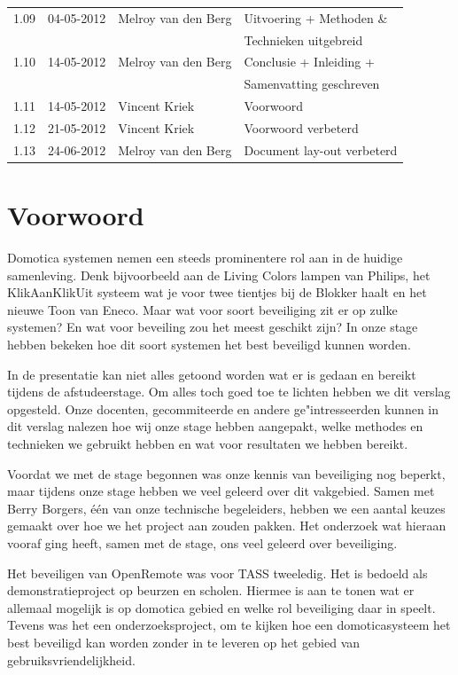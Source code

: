\documentclass[]{article}
\begin{document}
\begin{tabular}{|| l | l | l | l ||}
    1.09    &04-05-2012  &Melroy van den Berg &Uitvoering + Methoden \&        \\ 
            &            &                    &Technieken uitgebreid           \\\hline
    1.10    &14-05-2012  &Melroy van den Berg &Conclusie + Inleiding +         \\
            &            &                    &Samenvatting geschreven         \\\hline 
    1.11    &14-05-2012  &Vincent Kriek       &Voorwoord                       \\\hline
    1.12    &21-05-2012  &Vincent Kriek       &Voorwoord verbeterd             \\\hline
    1.13    &24-06-2012  &Melroy van den Berg &Document lay-out verbeterd      \\\hline
\end{tabular}

\newpage
\section*{Voorwoord}
Domotica systemen nemen een steeds prominentere rol aan in de huidige
samenleving. Denk bijvoorbeeld aan de Living Colors lampen van Philips, het
KlikAanKlikUit systeem wat je voor twee tientjes bij de Blokker haalt en het
nieuwe Toon van Eneco. Maar wat voor soort beveiliging zit er op zulke systemen?
En wat voor beveiling zou het meest geschikt zijn? In onze stage hebben bekeken
hoe dit soort systemen het best beveiligd kunnen worden.

In de presentatie kan niet alles getoond worden wat er is gedaan en bereikt
tijdens de afstudeerstage. Om alles toch goed toe te lichten hebben we dit
verslag opgesteld.  Onze docenten, gecommiteerde en andere ge"intresseerden
kunnen in dit verslag nalezen hoe wij onze stage hebben aangepakt, welke
methodes en technieken we gebruikt hebben en wat voor resultaten we hebben
bereikt.

Voordat we met de stage begonnen was onze kennis van beveiliging nog beperkt,
maar tijdens onze stage hebben we veel geleerd over dit vakgebied. Samen met
Berry Borgers, \'e\'en van onze technische begeleiders, hebben we een aantal keuzes
gemaakt over hoe we het project aan zouden pakken. Het onderzoek wat hieraan
vooraf ging heeft, samen met de stage, ons veel geleerd over beveiliging.

Het beveiligen van OpenRemote was voor TASS tweeledig. Het is bedoeld als
demonstratieproject op beurzen en scholen. Hiermee is aan te tonen wat er
allemaal mogelijk is op domotica gebied en welke rol beveiliging daar in speelt.
Tevens was het een onderzoeksproject, om te kijken hoe een domoticasysteem
het best beveiligd kan worden zonder in te leveren op het gebied van
gebruiksvriendelijkheid.
\end{document}
